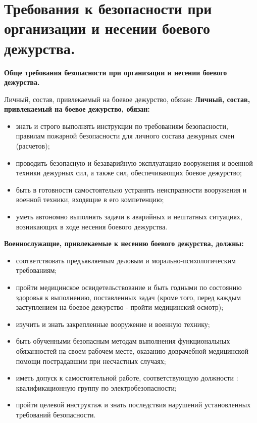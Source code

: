 \documentclass[12pt,a4paper]{report}
\begin{document}
\section{Требования к безопасности при организации и несении боевого дежурства.}
\begin{center}
	\textbf{Обще требования безопасности при организации и несении  боевого дежурства. }
\end{center}
Личный, состав, привлекаемый на боевое дежурство, обязан:
\textbf{  Личный, состав, привлекаемый на боевое дежурство, обязан:}
  \begin{itemize}
 \item  знать и строго выполнять инструкции по требованиям безопасности, правилам пожарной безопасности для личного состава дежурных смен (расчетов);
 \item  проводить безопасную и безаварийную эксплуатацию вооружения и военной техники дежурных сил, а также сил, обеспечивающих боевое дежурство;
 \item  быть в готовности самостоятельно устранять неисправности вооружения и военной техники, входящие в его компетенцию;
 \item  уметь автономно выполнять задачи в аварийных и нештатных ситуациях, возникающих в ходе несения боевого дежурства.
\end{itemize}
\textbf{Военнослужащие, привлекаемые к несению боевого дежурства, должны:}
\begin{itemize}
	\item  соответствовать предъявляемым деловым и морально-психологическим требованиям;
	\item  пройти медицинское освидетельствование и быть годными по состоянию здоровья к выполнению, поставленных задач (кроме того, перед каждым заступлением на боевое дежурство - пройти медицинский осмотр); 
	\item  изучить и знать закрепленные вооружение и военную технику;
	\item  быть обученными безопасным методам выполнения функциональных обязанностей на своем рабочем месте, оказанию доврачебной медицинской помощи пострадавшим при несчастных случаях;
	\item  иметь допуск к самостоятельной работе, соответствующую должности : квалификационную группу по электробезопасности;
	\item пройти целевой инструктаж и знать последствия нарушений установленных требований безопасности. 
\end{itemize}
\end{document}
